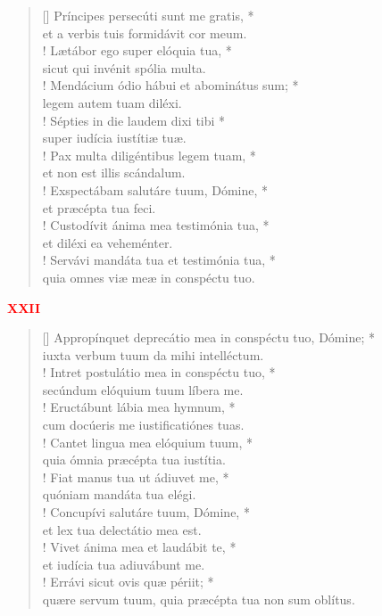 \begin{verse}[\versewidth]
Príncipes persecúti sunt me gratis, *\\
et a verbis tuis formidávit cor meum.\\!
\vin Lætábor ego super elóquia tua, *\\
\vin sicut qui invénit spólia multa.\\!
Mendácium ódio hábui et abominátus sum; *\\
legem autem tuam diléxi.\\!
\vin Sépties in die laudem dixi tibi *\\
\vin super iudícia iustítiæ tuæ.\\!
Pax multa diligéntibus legem tuam, *\\
et non est illis scándalum.\\!
\vin Exspectábam salutáre tuum, Dómine, *\\
\vin et præcépta tua feci.\\!
Custodívit ánima mea testimónia tua, *\\
et diléxi ea veheménter.\\!
\vin Servávi mandáta tua et testimónia tua, *\\
\vin quia omnes viæ meæ in conspéctu tuo.\\
\end{verse}
\begin{center}
\textcolor{red}{\bf XXII}\\
\end{center}
\begin{verse}[\versewidth]
Appropínquet deprecátio mea in conspéctu tuo, Dómine; *\\
iuxta verbum tuum da mihi intelléctum.\\!
\vin Intret postulátio mea in conspéctu tuo, *\\
\vin secúndum elóquium tuum líbera me.\\!
Eructábunt lábia mea hymnum, *\\
cum docúeris me iustificatiónes tuas.\\!
\vin Cantet lingua mea elóquium tuum, *\\
\vin quia ómnia præcépta tua iustítia.\\!
Fiat manus tua ut ádiuvet me, *\\
quóniam mandáta tua elégi.\\!
\vin Concupívi salutáre tuum, Dómine, *\\
\vin et lex tua delectátio mea est.\\!
Vivet ánima mea et laudábit te, *\\
et iudícia tua adiuvábunt me.\\!
\vin Errávi sicut ovis quæ périit; *\\
\vin quære servum tuum, quia præcépta tua non sum oblítus.\\
\end{verse}
\vspace{1cm}


